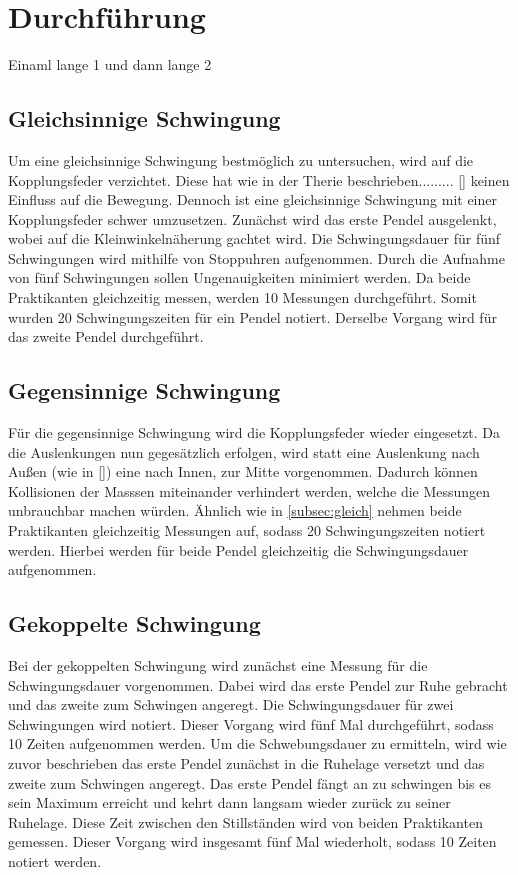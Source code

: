 \section{Durchführung}
\label{sec:Durchführung}

Einaml lange 1 und dann lange 2

\subsection{Gleichsinnige Schwingung}
\label{subsec:gleich}
Um eine gleichsinnige Schwingung bestmöglich zu untersuchen, wird auf die Kopplungsfeder verzichtet.
Diese hat wie in der Therie beschrieben......... \autoref{} keinen Einfluss auf die Bewegung.
Dennoch ist eine gleichsinnige Schwingung mit einer Kopplungsfeder schwer umzusetzen.
\noindent
Zunächst wird das erste Pendel ausgelenkt, wobei auf die Kleinwinkelnäherung gachtet wird.
Die Schwingungsdauer für fünf Schwingungen wird mithilfe von Stoppuhren aufgenommen.
Durch die Aufnahme von fünf Schwingungen sollen Ungenauigkeiten minimiert werden.
Da beide Praktikanten gleichzeitig messen, werden 10 Messungen durchgeführt.
Somit wurden 20 Schwingungszeiten für ein Pendel notiert.
Derselbe Vorgang wird für das zweite Pendel durchgeführt.

\subsection{Gegensinnige Schwingung}
Für die gegensinnige Schwingung wird die Kopplungsfeder wieder eingesetzt.
Da die Auslenkungen nun gegesätzlich erfolgen, wird statt eine Auslenkung nach Außen (wie in \autoref{})
eine nach Innen, zur Mitte vorgenommen. Dadurch können Kollisionen der Masssen miteinander verhindert werden,
welche die Messungen unbrauchbar machen würden.
Ähnlich wie in \autoref{subsec:gleich} nehmen beide Praktikanten gleichzeitig Messungen auf, sodass 20 Schwingungszeiten notiert werden.
Hierbei werden für beide Pendel gleichzeitig die Schwingungsdauer aufgenommen.

\subsection{Gekoppelte Schwingung}
Bei der gekoppelten Schwingung wird zunächst eine Messung für die Schwingungsdauer vorgenommen.
Dabei wird das erste Pendel zur Ruhe gebracht und das zweite zum Schwingen angeregt.
Die Schwingungsdauer für zwei Schwingungen wird notiert.
Dieser Vorgang wird fünf Mal durchgeführt, sodass 10 Zeiten aufgenommen werden.
\noindent
Um die Schwebungsdauer zu ermitteln, wird wie zuvor beschrieben das erste Pendel zunächst in die Ruhelage versetzt und das zweite zum Schwingen
angeregt.
Das erste Pendel fängt an zu schwingen bis es sein Maximum erreicht und kehrt dann langsam wieder zurück zu seiner Ruhelage.
Diese Zeit zwischen den Stillständen wird von beiden Praktikanten gemessen.
Dieser Vorgang wird insgesamt fünf Mal wiederholt, sodass 10 Zeiten notiert werden.